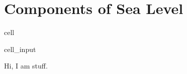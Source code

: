 \documentclass[letterpaper,10pt,english]{jupyterBook}
\begin{document}
\section{Components of Sea Level}
\label{\detokenize{notebooks/regional_and_local/SL_Components_intra-annual:components-of-sea-level}}\label{\detokenize{notebooks/regional_and_local/SL_Components_intra-annual::doc}}
\begin{sphinxuseclass}{cell}\begin{sphinxVerbatimInput}

\begin{sphinxuseclass}{cell_input}
\begin{sphinxVerbatim}[commandchars=\\\{\}]
\end{sphinxVerbatim}

\end{sphinxuseclass}\end{sphinxVerbatimInput}

\end{sphinxuseclass}
\sphinxAtStartPar
Hi, I am stuff.
\end{document}
